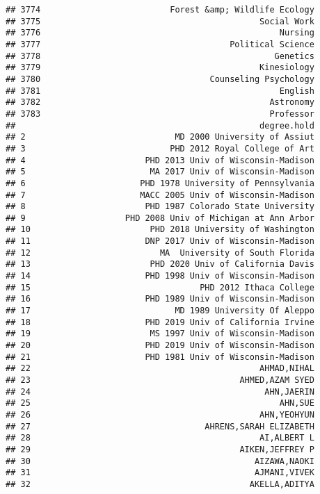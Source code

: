 \documentclass[
]{article}
\begin{document}
\begin{verbatim}
## 3774                          Forest &amp; Wildlife Ecology
## 3775                                            Social Work
## 3776                                                Nursing
## 3777                                      Political Science
## 3778                                               Genetics
## 3779                                            Kinesiology
## 3780                                  Counseling Psychology
## 3781                                                English
## 3782                                              Astronomy
## 3783                                              Professor
##                                                 degree.hold
## 2                              MD 2000 University of Assiut
## 3                             PHD 2012 Royal College of Art
## 4                        PHD 2013 Univ of Wisconsin-Madison
## 5                         MA 2017 Univ of Wisconsin-Madison
## 6                       PHD 1978 University of Pennsylvania
## 7                       MACC 2005 Univ of Wisconsin-Madison
## 8                        PHD 1987 Colorado State University
## 9                    PHD 2008 Univ of Michigan at Ann Arbor
## 10                        PHD 2018 University of Washington
## 11                       DNP 2017 Univ of Wisconsin-Madison
## 12                          MA  University of South Florida
## 13                        PHD 2020 Univ of California Davis
## 14                       PHD 1998 Univ of Wisconsin-Madison
## 15                                  PHD 2012 Ithaca College
## 16                       PHD 1989 Univ of Wisconsin-Madison
## 17                             MD 1989 University Of Aleppo
## 18                       PHD 2019 Univ of California Irvine
## 19                        MS 1997 Univ of Wisconsin-Madison
## 20                       PHD 2019 Univ of Wisconsin-Madison
## 21                       PHD 1981 Univ of Wisconsin-Madison
## 22                                              AHMAD,NIHAL
## 23                                          AHMED,AZAM SYED
## 24                                               AHN,JAERIN
## 25                                                  AHN,SUE
## 26                                              AHN,YEOHYUN
## 27                                   AHRENS,SARAH ELIZABETH
## 28                                              AI,ALBERT L
## 29                                          AIKEN,JEFFREY P
## 30                                             AIZAWA,NAOKI
## 31                                             AJMANI,VIVEK
## 32                                            AKELLA,ADITYA

\end{verbatim}
\end{document}
